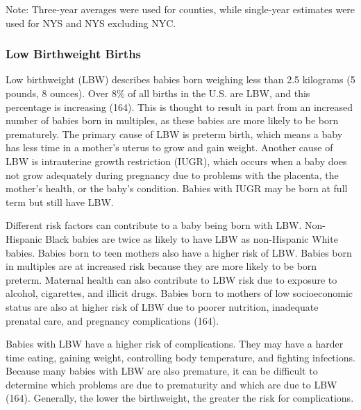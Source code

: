 \documentclass[
  english,
  letterpaper,
]{report}
\begin{document}
\begin{tcolorbox}[enhanced jigsaw, breakable, leftrule=.75mm, title=\textcolor{quarto-callout-note-color}{\faInfo}\hspace{0.5em}{Note}, bottomrule=.15mm, opacityback=0, left=2mm, colback=white, bottomtitle=1mm, coltitle=black, colbacktitle=quarto-callout-note-color!10!white, colframe=quarto-callout-note-color-frame, opacitybacktitle=0.6, toptitle=1mm, titlerule=0mm, arc=.35mm, rightrule=.15mm, toprule=.15mm]

Note: Three-year averages were used for counties, while single-year
estimates were used for NYS and NYS excluding NYC.

\end{tcolorbox}

\subsubsection{Low Birthweight Births}\label{low-birthweight-births}

Low birthweight (LBW) describes babies born weighing less than 2.5
kilograms (5 pounds, 8 ounces). Over 8\% of all births in the U.S. are
LBW, and this percentage is increasing (164). This is thought to result
in part from an increased number of babies born in multiples, as these
babies are more likely to be born prematurely. The primary cause of LBW
is preterm birth, which means a baby has less time in a mother's uterus
to grow and gain weight. Another cause of LBW is intrauterine growth
restriction (IUGR), which occurs when a baby does not grow adequately
during pregnancy due to problems with the placenta, the mother's health,
or the baby's condition. Babies with IUGR may be born at full term but
still have LBW.

Different risk factors can contribute to a baby being born with LBW.
Non-Hispanic Black babies are twice as likely to have LBW as
non-Hispanic White babies. Babies born to teen mothers also have a
higher risk of LBW. Babies born in multiples are at increased risk
because they are more likely to be born preterm. Maternal health can
also contribute to LBW risk due to exposure to alcohol, cigarettes, and
illicit drugs. Babies born to mothers of low socioeconomic status are
also at higher risk of LBW due to poorer nutrition, inadequate prenatal
care, and pregnancy complications (164).

Babies with LBW have a higher risk of complications. They may have a
harder time eating, gaining weight, controlling body temperature, and
fighting infections. Because many babies with LBW are also premature, it
can be difficult to determine which problems are due to prematurity and
which are due to LBW (164). Generally, the lower the birthweight, the
greater the risk for complications.
\end{document}
